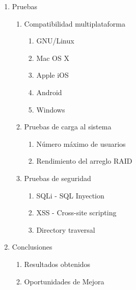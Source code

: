 {\begin{enumerate}
\begin{enumerate}
\begin{enumerate}
    \end{enumerate}
  \end{enumerate}
  \item Pruebas
  \begin{enumerate}
    \item Compatibilidad multiplataforma
    \begin{enumerate}
      \item GNU/Linux
      \item Mac OS X
      \item Apple iOS
      \item Android
      \item Windows
    \end{enumerate}
    \item Pruebas de carga al sistema
    \begin{enumerate}
      \item N\'{u}mero m\'{a}ximo de usuarios
      \item Rendimiento del arreglo RAID
    \end{enumerate}
    \item Pruebas de seguridad
    \begin{enumerate}
      \item SQLi - SQL Inyection
      \item XSS - Cross-site scripting
      \item Directory traversal
    \end{enumerate}
  \end{enumerate}
  \item Conclusiones
  \begin{enumerate}
    \item Resultados obtenidos
    \item Oportunidades de Mejora
  \end{enumerate}
\end{enumerate}
} %
